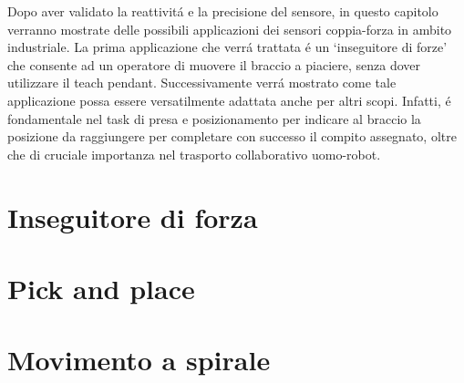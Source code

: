 Dopo aver validato la reattivit\'{a} e la precisione del sensore, in questo capitolo verranno mostrate delle possibili applicazioni 
dei sensori coppia-forza in ambito industriale. 
La prima applicazione che verr\'{a} trattata \'{e} un `inseguitore di forze' che consente ad un operatore di muovere il braccio 
a piaciere, senza dover utilizzare 
il teach pendant. Successivamente verr\'{a} mostrato come tale applicazione possa essere versatilmente adattata anche per altri scopi. 
Infatti, \'{e} fondamentale nel task di presa e posizionamento per indicare al braccio la posizione da raggiungere per completare 
con successo il compito assegnato, oltre che di cruciale importanza nel trasporto collaborativo uomo-robot. 

\section{Inseguitore di forza}


\section{Pick and place} \label{sec:pick_place}


\section{Movimento a spirale}
